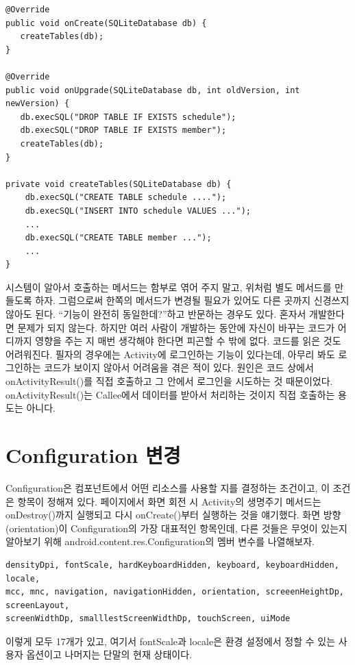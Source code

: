 \begin{lstlisting}[frame=single]
@Override
public void onCreate(SQLiteDatabase db) {
   createTables(db);
}

@Override
public void onUpgrade(SQLiteDatabase db, int oldVersion, int newVersion) {
   db.execSQL("DROP TABLE IF EXISTS schedule");
   db.execSQL("DROP TABLE IF EXISTS member");
   createTables(db);
}

private void createTables(SQLiteDatabase db) {
	db.execSQL("CREATE TABLE schedule ....");
    db.execSQL("INSERT INTO schedule VALUES ...");
    ...
    db.execSQL("CREATE TABLE member ...");
    ...
}
\end{lstlisting}

시스템이 알아서 호출하는 메서드는 함부로 엮어 주지 말고, 위처럼 별도 메서드를 만들도록 하자. 그럼으로써 한쪽의 메서드가 변경될 필요가 있어도 다른 곳까지 신경쓰지 않아도 된다.
``기능이 완전히 동일한데?''하고 반문하는 경우도 있다. 혼자서 개발한다면 문제가 되지 않는다. 하지만 여러 사람이 개발하는 동안에 자신이 바꾸는 코드가 어디까지 영향을 주는 지 매번 생각해야 한다면 피곤할 수 밖에 없다. 
코드를 읽은 것도 어려워진다. 
필자의 경우에는 Activity에 로그인하는 기능이 있다는데, 아무리 봐도 로그인하는 코드가 보이지 않아서 어려움을 겪은 적이 있다. 
원인은 코드 상에서 onActivityResult()를 직접 호출하고 그 안에서 로그인을 시도하는 것 때문이었다. onActivityResult()는 Callee에서 데이터를 받아서 처리하는 것이지 직접 호출하는 용도는 아니다.

\section{Configuration 변경}
Configuration은 컴포넌트에서 어떤 리소스를 사용할 지를 결정하는 조건이고, 이 조건은 항목이 정해져 있다. 
\pageref{flow}페이지에서 화면 회전 시 Activity의 생명주기 메서드는 onDestroy()까지 실행되고 다시 onCreate()부터 실행하는 것을 얘기했다. 
화면 방향(orientation)이 Configuration의 가장 대표적인 항목인데, 다른 것들은 무엇이 있는지 알아보기 위해 android.content.res.Configuration의 멤버 변수를 나열해보자. 
\begin{lstlisting}[frame=single]
densityDpi, fontScale, hardKeyboardHidden, keyboard, keyboardHidden, locale, 
mcc, mnc, navigation, navigationHidden, orientation, screeenHeightDp, screenLayout, 
screenWidthDp, smalllestScreenWidthDp, touchScreen, uiMode 
\end{lstlisting}
이렇게 모두 17개가 있고, 
여기서 fontScale과 locale은 환경 설정에서 정할 수 있는 사용자 옵션이고 나머지는 단말의 현재 상태이다.\\

